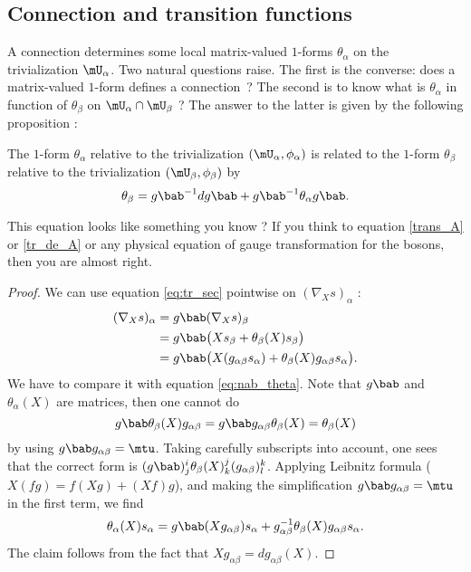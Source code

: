 \subsection{Connection and transition functions}

A connection determines some local matrix-valued $1$-forms $\theta_{\alpha}$ on the trivialization $\mU_{\alpha}$. Two natural questions raise. The first is the converse: does a matrix-valued $1$-form defines a connection~? The second is to know  what is $\theta_{\alpha}$ in function of $\theta_{\beta}$ on $\mU_{\alpha}\cap\mU_{\beta}$ ? The answer to the latter is  given by the following proposition :

\begin{proposition}
The $1$-form $\theta_{\alpha}$ relative to the trivialization $(\mU_{\alpha},\phi_{\alpha})$ is related to the $1$-form $\theta_{\beta}$ relative to the trivialization $(\mU_{\beta},\phi_{\beta})$ by
\begin{equation}\label{eq:theta_g}
  \theta_{\beta}=g\bab^{-1} dg\bab+g\bab^{-1}\theta_{\alpha} g\bab.
\end{equation}
\end{proposition}

This equation looks like something you know ? If you think to equation \eqref{trans_A} or \eqref{tr_de_A} or any physical equation of gauge transformation for the bosons, then you are almost right.
 
\begin{proof}
We can use equation \eqref{eq:tr_sec} pointwise on $(\nabla_X s)_{\alpha}$ :
\begin{equation}
\begin{split}
(\nabla_X s)_{\alpha}&=g\bab(\nabla_Xs)_{\beta}\\
                  &=g\bab\big(   Xs_{\beta}+\theta_{\beta}(X)s_{\beta}   \big) \\
                  &=g\bab\big(   X(g_{\alpha\beta} s_{\alpha})+\theta_{\beta}(X)g_{\alpha\beta} s_{\alpha}   \big).
\end{split}
\end{equation} 
We have to compare it with equation \eqref{eq:nab_theta}. Note that $g\bab$ and $\theta_{\alpha}(X)$ are matrices, then one cannot do
\[
   g\bab\theta_{\beta}(X)g_{\alpha\beta} =g\bab g_{\alpha\beta}\theta_{\beta}(X)=\theta_{\beta}(X)
\]
by using $g\bab g_{\alpha\beta}=\mtu$.  Taking carefully subscripts into account, one sees that the correct form is $(g\bab)^i_j\theta_{\beta}(X)^j_k(g_{\alpha\beta})^k_l$. Applying Leibnitz formula ($X(fg)=f(Xg)+(Xf)g$), and making the simplification $g\bab g_{\alpha\beta}=\mtu$ in the first term, we find
\[
  \theta_{\alpha}(X)s_{\alpha}=g\bab(Xg_{\alpha\beta})s_{\alpha}+g_{\alpha\beta}^{-1}\theta_{\beta}(X)g_{\alpha\beta} s_{\alpha}.
\]
The claim follows from the fact that $Xg_{\alpha\beta}=dg_{\alpha\beta}(X)$.
\end{proof}

